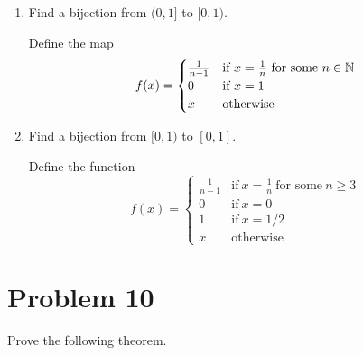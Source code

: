\documentclass[11pt,a4paper]{article}
\begin{document}
\begin{enumerate}
\begin{proof}
        \end{proof}
    \item Find a bijection from \( (0,1]  \) to \( [0,1) \).
        \begin{solution}
          Define the map  
          \[  f(x) = 
          \begin{cases}
              \frac{ 1 }{ n - 1  }  &\text{if} \ x = \frac{ 1 }{ n }  \ \text{for some} \ n \in \mathbb{N}  \\
              0 &\text{if} \ x = 1 \\
              x &\text{otherwise}
          \end{cases}  \]
        \end{solution}
    \item Find a bijection from \(  [0,1)  \) to \( [0,1] \).
        \begin{solution}
          Define the function  
          \[  f(x) = 
          \begin{cases}
              \frac{ 1 }{ n - 1   } &\text{if} \  x = \frac{ 1 }{ n } \ \text{for some} \  n \geq 3 \\   
              0 &\text{if} \ x = 0 \\ 
              1 &\text{if} \ x = 1/2 \\
              x &\text{otherwise} 
          \end{cases} \]
        \end{solution}

\end{enumerate}


\section{Problem 10} Prove the following theorem.
\end{document}
